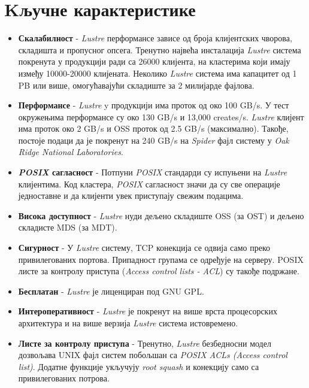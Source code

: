 \section{Kључне карактеристике}

\begin{itemize}
\item  \textbf{Скалабилност} - \textit{Lustre} перформансе зависе од броја клијентских чворова, складишта и пропусног опсега. Тренутно највећа инсталација   \textit{Lustre} система покренута у продукцији ради са 26000 клијента, на кластерима који имају између 10000-20000 клијената. Неколико   \textit{Lustre} система има капацитет од 1 PB  или више, омогућавајући складиште за 2 милијарде фајлова.

\item  \textbf{Перформансе} -   \textit{Lustre}  y продукцији има проток од око 100 GB/s. У тест окружењима перформансе су око 130 GB/s и 13,000 creates/s. 
  \textit{Lustre}  клијент има проток око 2 GB/s и OSS проток од 2.5 GB/s (максимално). Такође, постоје подаци да је покренут на 240 GB/s на \textit{Spider} фајл систему у \textit{Oak Ridge National Laboratories}.

\item \textbf{\textit{POSIX} сагласност} - Потпуни \textit{POSIX} стандарди су  испуњени на   \textit{Lustre}  клијентима. Код кластера, \textit{POSIX} сагласност значи да су све операције једноставне и да клијенти увек приступају свежим подацима.

\item \textbf{Висока доступност} -   \textit{Lustre}  нуди дељено складиште OSS (за OST) и дељено складисте MDS (за MDT).

\item  \textbf{Сигурност} - У   \textit{Lustre} систему, TCP конекција се одвија само преко привилегованих портова. Припадност групама се одређује на серверу.  POSIX листе за контролу приступа (\textit{Access control lists - \gls{ACL}}) су такође подржане.

\item  \textbf{Бесплатан} -   \textit{Lustre}  је лиценциран под  GNU GPL.


\item  \textbf{Интероперативност} - \textit{Lustre} је покренут на више врста процесорских архитектура и на више верзија   \textit{Lustre} система истовремено. 

\item \textbf{Листе за контролу приступа} - Тренутно,   \textit{Lustre} безбедносни модел дозвољава UNIX фајл систем побољшан са \textit{POSIX ACLs (Access control list)}. Додатне функције укључују \textit{root squash} и конекцију само са привилегованих потрова.


\end{itemize}

